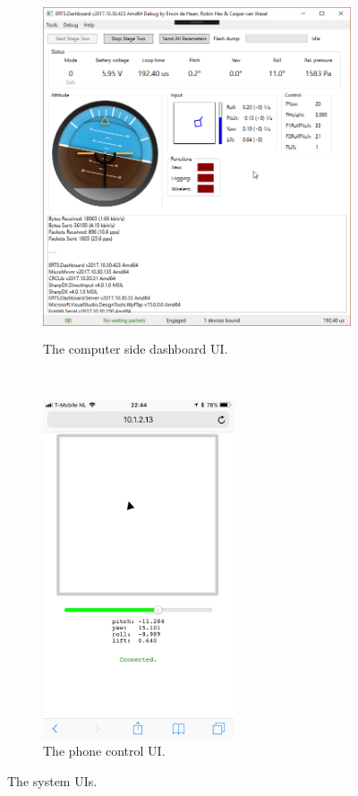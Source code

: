 \documentclass[final]{article}
\begin{document}
\begin{figure}[H]
    \begin{subfigure}[b]{0.6\textwidth}
    \centering
        \includegraphics[height=10cm]{resources/dashboard-gui.png}
        \caption{The computer side dashboard UI.}
        \label{fig:pc-dashboard-gui}
    \end{subfigure}
    ~
    \begin{subfigure}[b]{0.4\textwidth}
    \centering
        \includegraphics[height=10cm]{resources/phone-gui.PNG}
        \caption{The phone control UI.}
        \label{fig:phone-control-gui}
    \end{subfigure}
    \caption{The system UIs.}
    \label{fig:system-guis}
\end{figure}
\end{document}
